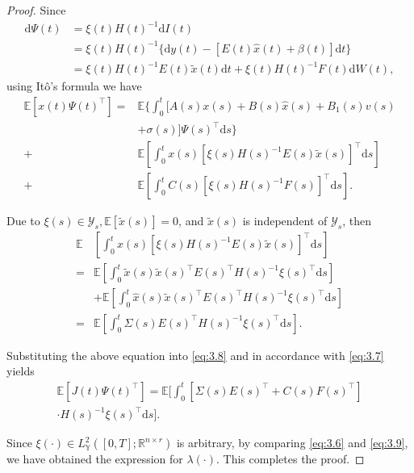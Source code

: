 \documentclass[lettersize,journal]{IEEEtran}
\theoremstyle{plain}
\theoremstyle{definition}
\begin{document}
\begin{proof}
	Since 
	\begin{equation*}
		\begin{aligned}
			\mathrm{d}\Psi(t) &= \xi(t)H(t)^{-1}\mathrm{d}I(t) \\
			&= \xi(t)H(t)^{-1}\{\mathrm{d}y(t) - [E(t)\widehat{x}(t) + \beta(t)]\mathrm{d}t\}\\
			& =\xi(t)H(t)^{-1}E(t)\widetilde{x}(t)\mathrm{d}t + \xi(t)H(t)^{-1}F(t)\mathrm{d}W(t),
		\end{aligned}
	\end{equation*}
	using It\^o's formula we have 
	\begin{equation}\label{eq:3.8}
		\begin{aligned}
			\mathbb{E}[x(t)\Psi(t)^{\top}] =& \mathbb{E}\bigg\{ \int_{0}^{t} [A(s)x(s) + B(s)\widehat{x}(s) + B_1(s)v(s) \\
			& + \sigma(s)]\Psi(s)^{\top}\mathrm{d}s \Big\}\\
			+& \mathbb{E} \left[\int_{0}^{t} x(s)[\xi(s) H(s)^{-1} E(s)\widetilde{x}(s)]^{\top}\mathrm{d}s\right]\\
			+& \mathbb{E}\left[\int_{0}^{t} C(s)[\xi(s)H(s)^{-1}F(s)]^{\top}\mathrm{d}s\right].
		\end{aligned}
	\end{equation}
	
	Due to $\xi(s) \in \mathcal{Y}_s, \mathbb{E}[\widetilde{x}(s)] = 0$, and $\widetilde{x}(s)$ is independent of $\mathcal{Y}_s$, then
	\begin{equation*}
		\begin{aligned}
			\mathbb{E}&\left[\int_{0}^{t} x(s)[\xi(s) H(s)^{-1} E(s)\widetilde{x}(s)]^{\top}\mathrm{d}s\right]\\
			=&\mathbb{E} \left[\int_{0}^{t} \widetilde{x}(s)\widetilde{x}(s)^\top E(s)^\top H(s)^{-1}\xi(s)^{\top}\mathrm{d}s\right] \\
			&+ \mathbb{E} \left[\int_{0}^{t} \widehat{x}(s)\widetilde{x}(s)^\top E(s)^\top H(s)^{-1}\xi(s)^{\top}\mathrm{d}s\right]\\
			=&\mathbb{E} \left[\int_{0}^{t} \Sigma(s)E(s)^\top H(s)^{-1}\xi(s)^{\top}\mathrm{d}s\right].
		\end{aligned}
	\end{equation*}
	
	Substituting the above equation into \eqref{eq:3.8} and in accordance with \eqref{eq:3.7} yields 
	\begin{equation}\label{eq:3.9}
		\begin{aligned}
			\mathbb{E}[J(t)\Psi(t)^{\top}] = \mathbb{E}\bigg[\int_0^t [\Sigma(s)E(s)^\top + C(s)F(s)^\top]\\
			\cdot H(s)^{-1}\xi(s)^\top\mathrm{d}s\Big].
		\end{aligned}
	\end{equation}
	
	Since $\xi(\cdot) \in L_{\mathbb{Y}}^2([0,T];\mathbb{R}^{n \times r})$ is arbitrary, by comparing \eqref{eq:3.6} and \eqref{eq:3.9}, we have obtained the expression for $\lambda(\cdot)$. This completes the proof.
\end{proof}
\end{document}
